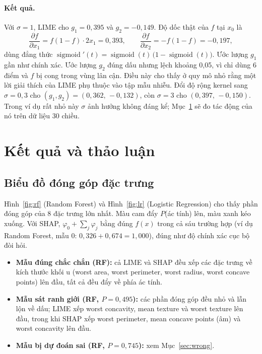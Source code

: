 \documentclass[11pt,a4paper]{article}
\begin{document}
\paragraph{Kết quả.} Với $\sigma = 1$, LIME cho $g_1 = 0{,}395$ và
$g_2 = -0{,}149$. Độ dốc thật của $f$ tại $x_0$ là
\begin{equation}
\frac{\partial f}{\partial x_1} = f(1-f)\cdot 2x_1 = 0{,}393, \qquad
\frac{\partial f}{\partial x_2} = -f(1-f) = -0{,}197,
\end{equation}
dùng đẳng thức $\operatorname{sigmoid}'(t) = \operatorname{sigmoid}(t)\,\big(1 - \operatorname{sigmoid}(t)\big)$.
Ước lượng $g_1$ gần như chính xác. Ước lượng $g_2$ đúng dấu nhưng lệch khoảng
0,05, vì chỉ dùng 6 điểm và $f$ bị cong trong vùng lân cận. Điều này cho thấy
ở quy mô nhỏ rằng một lời giải thích của LIME phụ thuộc vào tập mẫu nhiễu.
Đổi độ rộng kernel sang $\sigma = 0{,}3$ cho
$(g_1, g_2) = (0{,}362,\, -0{,}132)$, còn $\sigma = 3$ cho
$(0{,}397,\, -0{,}150)$. Trong ví dụ rất nhỏ này $\sigma$ ảnh hưởng không
đáng kể; Mục~\ref{sec:results} sẽ đo tác động của nó trên dữ liệu 30 chiều.

\section{Kết quả và thảo luận}\label{sec:results}

\subsection{Biểu đồ đóng góp đặc trưng}
\label{sec:charts}
Hình~\ref{fig:rf} (Random Forest) và Hình~\ref{fig:lr} (Logistic Regression)
cho thấy phần đóng góp của 8 đặc trưng lớn nhất. Màu cam đẩy
$P$(ác tính) lên, màu xanh kéo xuống. Với SHAP,
$\varphi_0 + \sum_j \varphi_j$ bằng đúng $f(x)$ trong cả sáu trường hợp (ví
dụ Random Forest, mẫu 0: $0{,}326 + 0{,}674 = 1{,}000$), đúng như độ chính
xác cục bộ đòi hỏi.
\begin{itemize}
  \item \textbf{Mẫu đúng chắc chắn (RF):} cả LIME và SHAP đều xếp các đặc
        trưng về kích thước khối u (worst area, worst perimeter, worst
        radius, worst concave points) lên đầu, tất cả đều đẩy về phía ác
        tính.
  \item \textbf{Mẫu sát ranh giới (RF, $P = 0{,}495$):} các phần đóng góp đều
        nhỏ và lẫn lộn về dấu; LIME xếp worst concavity, mean texture và
        worst texture lên đầu, trong khi SHAP xếp worst perimeter, mean
        concave points (âm) và worst concavity lên đầu.
  \item \textbf{Mẫu bị dự đoán sai (RF, $P = 0{,}745$):} xem
        Mục~\ref{sec:wrong}.
\end{itemize}
\end{document}
